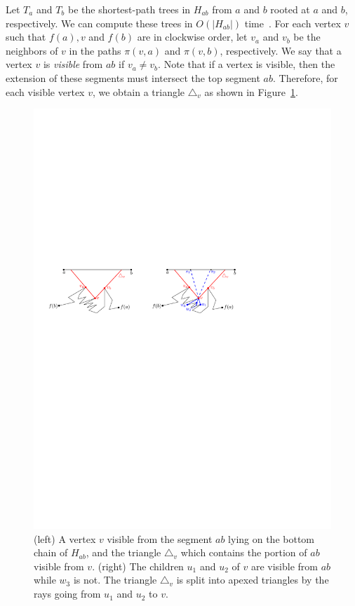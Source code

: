 \documentclass[a4paper,UKenglish]{lipics}
\newcommand{\ff}[1]{\ensuremath{f(#1)}}
\newcommand{\p}[2]{\ensuremath{\pi(#1, #2)}}
\begin{document}
Let $T_a$ and $T_b$ be the shortest-path trees in $H_{ab}$ from $a$ and $b$ rooted at $a$ and $b$, respectively. 
We can compute these trees in $O(|H_{ab}|)$ time~\cite{guibasShortestPathTree}. 
For each vertex $v$ such that  $\ff{a}, v$ and $\ff{b}$ are in clockwise order, let $v_a$ and $v_b$ be the neighbors of $v$ in the paths $\p{v}{a}$ and $\p{v}{ b}$, respectively.
We say that a vertex $v$ is \emph{visible} from $ab$ if $v_a\neq v_b$.
Note that if a vertex is visible, then the extension of these segments must intersect the top segment $ab$. 
Therefore, for each visible vertex $v$, we obtain a triangle $\triangle_v$ as shown in Figure~\ref{fig:Hourglass Cover}.

\begin{figure}[tb]
\centering
\includegraphics{img/HourglassCover.pdf}

\caption{\small (left) A vertex $v$ visible from the segment $ab$ lying on the bottom chain of $H_{ab}$, and the triangle $\triangle_v$ which contains the portion of $ab$ visible from $v$. (right) The children $u_1$ and $u_2$ of $v$ are visible from $ab$ while $w_3$ is not. The triangle  $\triangle_v$ is split into apexed triangles by the rays going from $u_1$ and $u_2$ to $v$. }
\label{fig:Hourglass Cover}
\end{figure}
\end{document}
